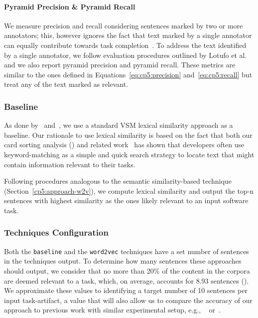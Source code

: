 \paragraph{\textbf{Pyramid Precision \& Pyramid Recall}} 

We measure precision and recall considering sentences marked by two or more annotators; this, however ignores the fact that text marked by a single annotator can equally contribute towards task completion~\cite{marques2020}. To address the text identified by a single annotator, we 
follow evaluation procedures outlined by Lotufo et al.~\cite{Lotufo2012} and we
also report pyramid precision and pyramid recall. These metrics are similar to the ones defined in 
Equations~\ref{eq:cp5:precision} and~\ref{eq:cp5:recall} but treat any of the text marked as relevant.






\subsubsection{Baseline}


As done by~\cite{Lin2021} and~\cite{Ye2016}, we use a standard VSM lexical similarity approach as a baseline. Our rationale to use 
lexical similarity is based on the fact that 
both our card sorting analysis () and related work~\cite{Ko2006a, Freund2015} has shown that developers often use keyword-matching as a simple and quick search strategy to locate text that might contain information relevant to their tasks.


Following procedures analogous to the semantic similarity-based technique (Section~\ref{cp5:approach-w2v}), we compute lexical similarity and output the top-n sentences with highest similarity as the ones likely relevant to an input software task.




\subsubsection{Techniques Configuration}




Both the \texttt{baseline} and the \texttt{word2vec} techniques have a set number of sentences in the techniques output. To determine how many sentences these approaches should output, we consider that 
no more than 20\% of the content in the corpora are deemed relevant to a task, which, on average, accounts for 8.93 sentences (). We approximate these values to identifying a target number of 10 sentences per input task-artifact, a value that will also allow us to compare the accuracy of our approach to previous work with similar experimental setup, e.g., ~\cite{Xu2017} or~\cite{Lotufo2012}.




